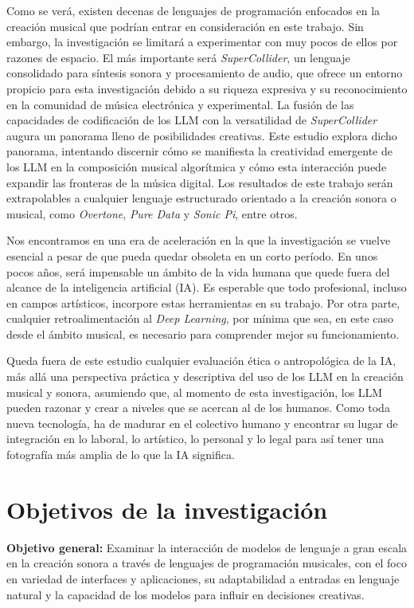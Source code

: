 Como se verá, existen decenas de lenguajes de programación enfocados en la creación musical que podrían entrar en consideración en este trabajo. Sin embargo, la investigación se limitará a experimentar con muy pocos de ellos por razones de espacio. El más importante será \textit{SuperCollider}, un lenguaje consolidado para síntesis sonora y procesamiento de audio, que ofrece un entorno propicio para esta investigación debido a su riqueza expresiva y su reconocimiento en la comunidad de música electrónica y experimental. La fusión de las capacidades de codificación de los LLM con la versatilidad de \textit{SuperCollider} augura un panorama lleno de posibilidades creativas. Este estudio explora dicho panorama, intentando discernir cómo se manifiesta la creatividad emergente de los LLM en la composición musical algorítmica y cómo esta interacción puede expandir las fronteras de la música digital. Los resultados de este trabajo serán extrapolables a cualquier lenguaje estructurado orientado a la creación sonora o musical, como \textit{Overtone}, \textit{Pure Data} y \textit{Sonic Pi}, entre otros.

Nos encontramos en una era de aceleración en la que la investigación se vuelve esencial a pesar de que pueda quedar obsoleta en un corto período. En unos pocos años, será impensable un ámbito de la vida humana que quede fuera del alcance de la inteligencia artificial (IA). Es esperable que todo profesional, incluso en campos artísticos, incorpore estas herramientas en su trabajo. Por otra parte, cualquier retroalimentación al \textit{Deep Learning}, por mínima que sea, en este caso desde el ámbito musical, es necesario para comprender mejor su funcionamiento.

Queda fuera de este estudio cualquier evaluación ética o antropológica de la IA, más allá una perspectiva práctica y descriptiva del uso de los LLM en la creación musical y sonora, asumiendo que, al momento de esta investigación, los LLM pueden razonar y crear a niveles que se acercan al de los humanos. Como toda nueva tecnología, ha de madurar en el colectivo humano y encontrar su lugar de integración en lo laboral, lo artístico, lo personal y lo legal para así tener una fotografía más amplia de lo que la IA significa. 


\section{Objetivos de la investigación}

\textbf{Objetivo general:} Examinar la interacción de modelos de lenguaje a gran escala en la creación sonora a través de lenguajes de programación musicales, con el foco en variedad de interfaces y aplicaciones, su adaptabilidad a entradas en lenguaje natural y la capacidad de los modelos para influir en decisiones creativas.

